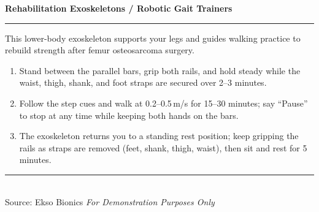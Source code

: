 \documentclass[11pt,a4paper]{article}
\begin{document}
\vspace{-0.3em}
\noindent\dashrule{\textwidth}
\begin{center}
{\large\bfseries Rehabilitation Exoskeletons / Robotic Gait Trainers}
\end{center}
\noindent\rule{\textwidth}{0.4pt}

\vspace{0.3em}
This lower-body exoskeleton supports your legs and guides walking practice to rebuild strength after femur osteosarcoma surgery.

\begin{enumerate}[leftmargin=1.5em,itemsep=2pt]
  \item Stand between the parallel bars, grip both rails, and hold steady while the waist, thigh, shank, and foot straps are secured over 2--3 minutes.
  \item Follow the step cues and walk at 0.2--0.5\,m/s for 15--30 minutes; say ``Pause'' to stop at any time while keeping both hands on the bars.
  \item The exoskeleton returns you to a standing rest position; keep gripping the rails as straps are removed (feet, shank, thigh, waist), then sit and rest for 5 minutes.
\end{enumerate}

\vfill
\noindent\rule{\textwidth}{0.4pt}\\
{\scriptsize Source: Ekso Bionics \hfill \textit{For Demonstration Purposes Only}}
\end{document}
